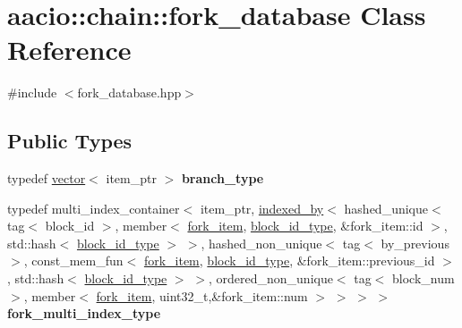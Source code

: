 \hypertarget{classaacio_1_1chain_1_1fork__database}{}\section{aacio\+:\+:chain\+:\+:fork\+\_\+database Class Reference}
\label{classaacio_1_1chain_1_1fork__database}


{\ttfamily \#include $<$fork\+\_\+database.\+hpp$>$}

\subsection*{Public Types}
\begin{DoxyCompactItemize}
\item 
\mbox{\label{classaacio_1_1chain_1_1fork__database_ae2868c2b7b02d80861fbf58caeaa4373}} 
typedef \mbox{\hyperlink{classstd_1_1vector}{vector}}$<$ item\+\_\+ptr $>$ {\bfseries branch\+\_\+type}
\item 
\mbox{\label{classaacio_1_1chain_1_1fork__database_a5aae893a698a70b327f5c10d5f35ee6b}} 
typedef multi\+\_\+index\+\_\+container$<$ item\+\_\+ptr, \mbox{\hyperlink{structaacio_1_1indexed__by}{indexed\+\_\+by}}$<$ hashed\+\_\+unique$<$ tag$<$ block\+\_\+id $>$, member$<$ \mbox{\hyperlink{structaacio_1_1chain_1_1fork__item}{fork\+\_\+item}}, \mbox{\hyperlink{classfc_1_1sha256}{block\+\_\+id\+\_\+type}}, \&fork\+\_\+item\+::id $>$, std\+::hash$<$ \mbox{\hyperlink{classfc_1_1sha256}{block\+\_\+id\+\_\+type}} $>$ $>$, hashed\+\_\+non\+\_\+unique$<$ tag$<$ by\+\_\+previous $>$, const\+\_\+mem\+\_\+fun$<$ \mbox{\hyperlink{structaacio_1_1chain_1_1fork__item}{fork\+\_\+item}}, \mbox{\hyperlink{classfc_1_1sha256}{block\+\_\+id\+\_\+type}}, \&fork\+\_\+item\+::previous\+\_\+id $>$, std\+::hash$<$ \mbox{\hyperlink{classfc_1_1sha256}{block\+\_\+id\+\_\+type}} $>$ $>$, ordered\+\_\+non\+\_\+unique$<$ tag$<$ block\+\_\+num $>$, member$<$ \mbox{\hyperlink{structaacio_1_1chain_1_1fork__item}{fork\+\_\+item}}, uint32\+\_\+t,\&fork\+\_\+item\+::num $>$ $>$ $>$ $>$ {\bfseries fork\+\_\+multi\+\_\+index\+\_\+type}
\end{DoxyCompactItemize}
